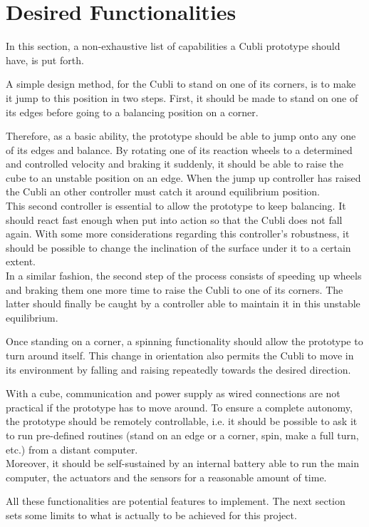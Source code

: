 \section{Desired Functionalities}\label{sec:mainFunctionalities}
In this section, a non-exhaustive list of capabilities a Cubli prototype should have, is put forth.

A simple design method, for the Cubli to stand on one of its corners, is to make it jump to this position in two steps. First, it should be made to stand on one of its edges before going to a balancing position on a corner.

Therefore, as a basic ability, the prototype should be able to jump onto any one of its edges and balance.
By rotating one of its reaction wheels to a determined and controlled velocity and braking it suddenly, it should be able to raise the cube to an unstable position on an edge. When the jump up controller has raised the Cubli an other controller must catch it around equilibrium position.\\
This second controller is essential to allow the prototype to keep balancing. It should react fast enough when put into action so that the Cubli does not fall again. With some more considerations regarding this controller's robustness, it should be possible to change the inclination of the surface under it to a certain extent.\\
In a similar fashion, the second step of the process consists of speeding up wheels and braking them one more time to raise the Cubli to one of its corners. The latter should finally be caught by a controller able to maintain it in this unstable equilibrium.

Once standing on a corner, a spinning functionality should allow the prototype to turn around itself. This change in orientation also permits the Cubli to move in its environment by falling and raising repeatedly towards the desired direction.

With a cube, communication and power supply as wired connections are not practical if the prototype has to move around. To ensure a complete autonomy, the prototype should be remotely controllable, i.e. it should be possible to ask it to run pre-defined routines (stand on an edge or a corner, spin, make a full turn, etc.) from a distant computer.\\
Moreover, it should be self-sustained by an internal battery able to run the main computer, the actuators and the sensors for a reasonable amount of time.

All these functionalities are potential features to implement. The next section sets some limits to what is actually to be achieved for this project.